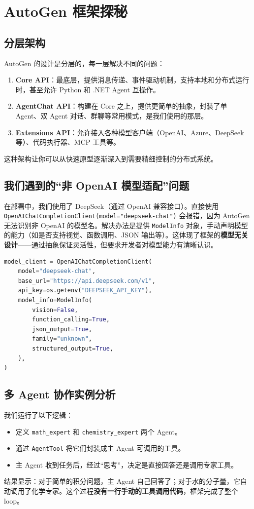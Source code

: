\documentclass[11pt,a4paper]{article}
\begin{document}
\section{AutoGen 框架探秘}
\subsection{分层架构}
AutoGen 的设计是分层的，每一层解决不同的问题：
\begin{enumerate}
    \item \textbf{Core API}：最底层，提供消息传递、事件驱动机制，支持本地和分布式运行时，甚至允许 Python 和 .NET Agent 互操作。
    \item \textbf{AgentChat API}：构建在 Core 之上，提供更简单的抽象，封装了单 Agent、双 Agent 对话、群聊等常用模式，是我们使用的那层。
    \item \textbf{Extensions API}：允许接入各种模型客户端（OpenAI、Azure、DeepSeek 等）、代码执行器、MCP 工具等。
\end{enumerate}
这种架构让你可以从快速原型逐渐深入到需要精细控制的分布式系统。

\subsection{我们遇到的“非 OpenAI 模型适配”问题}
在部署中，我们使用了 DeepSeek（通过 OpenAI 兼容接口）。直接使用 \texttt{OpenAIChatCompletionClient(model="deepseek-chat")} 会报错，因为 AutoGen 无法识别非 OpenAI 的模型名。解决办法是提供 \texttt{ModelInfo} 对象，手动声明模型的能力（如是否支持视觉、函数调用、JSON 输出等）。这体现了框架的\textbf{模型无关设计}——通过抽象保证灵活性，但要求开发者对模型能力有清晰认识。

\begin{lstlisting}[language=Python, caption=适配 DeepSeek 的模型客户端配置]
model_client = OpenAIChatCompletionClient(
    model="deepseek-chat",
    base_url="https://api.deepseek.com/v1",
    api_key=os.getenv("DEEPSEEK_API_KEY"),
    model_info=ModelInfo(
        vision=False,
        function_calling=True,
        json_output=True,
        family="unknown",
        structured_output=True,
    ),
)
\end{lstlisting}

\subsection{多 Agent 协作实例分析}
我们运行了以下逻辑：
\begin{itemize}
    \item 定义 \texttt{math\_expert} 和 \texttt{chemistry\_expert} 两个 Agent。
    \item 通过 \texttt{AgentTool} 将它们封装成主 Agent 可调用的工具。
    \item 主 Agent 收到任务后，经过“思考”，决定是直接回答还是调用专家工具。
\end{itemize}
结果显示：对于简单的积分问题，主 Agent 自己回答了；对于水的分子量，它自动调用了化学专家。这个过程\textbf{没有一行手动的工具调用代码}，框架完成了整个 loop。
\end{document}
